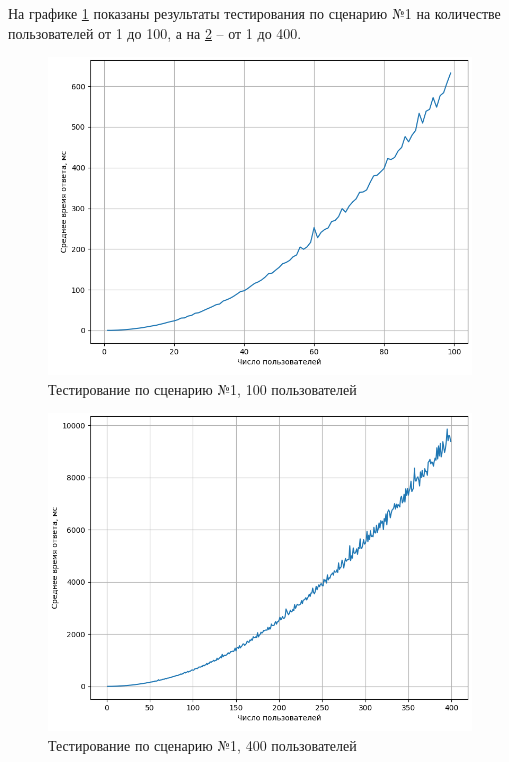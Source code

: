 На графике \ref{test1_1} показаны результаты тестирования по сценарию №1 на количестве пользователей от 1 до 100, а на \ref{test1_2} -- от 1 до 400.

\begin{figure}[H]
	\begin{center}
		\includegraphics[page=1,scale=0.8]{assets/exp1_100.png}
	\end{center}
	\caption{Тестирование по сценарию №1, 100 пользователей}
	\label{test1_1}
\end{figure}

\begin{figure}[H]
	\begin{center}
		\includegraphics[page=1,scale=0.8]{assets/exp1_400.png}
	\end{center}
	\caption{Тестирование по сценарию №1, 400 пользователей}
	\label{test1_2}
\end{figure}


